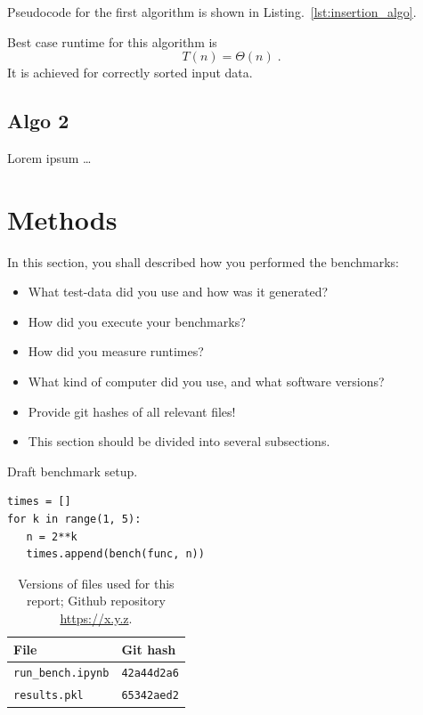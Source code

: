 \documentclass[sigconf, nonacm, natbib, screen, balance=False]{acmart}
\begin{document}
Pseudocode for the first algorithm is shown in
Listing.~\ref{lst:insertion_algo}.

Best case runtime for this algorithm is
\begin{equation}
  T(n) = \Theta(n) \;.  \label{eq:ins_sort_best}
\end{equation}
It is achieved for correctly sorted input data.

\subsection{Algo 2}\label{sec:algo2}

Lorem ipsum \dots


\section{Methods}\label{sec:methods}

In this section, you shall described how you performed the
benchmarks:
\begin{itemize}
\item What test-data did you use and how was it generated?
\item How did you execute your benchmarks?
\item How did you measure runtimes?
\item What kind of computer did you use, and what software versions?
\item Provide git hashes of all relevant files!
\item This section should be divided into several subsections.
\end{itemize}

\begin{listing}
  \caption{Draft benchmark setup.}
  \label{lst:bench_setup}
  \begin{lstlisting}
times = []
for k in range(1, 5):
   n = 2**k
   times.append(bench(func, n))
  \end{lstlisting}
\end{listing}

\begin{table}
  \caption{Versions of files used for this report; Github repository
    \url{https://x.y.z}.}
  \label{tab:hashes}
  \begin{tabular}{ll}
    \hline
    File & Git hash \\\hline
    \verb!run_bench.ipynb! & \verb!42a44d2a6! \\
    \verb!results.pkl! & \verb!65342aed2! \\\hline
  \end{tabular}
\end{table}
\end{document}
